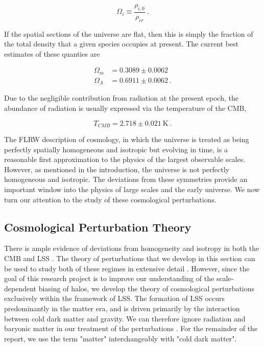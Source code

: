 \documentclass[10pt,letterpaper,final]{iopart}
\numberwithin{equation}{subsection}
\def\ni{\noindent}
\begin{document}
\begin{equation}\label{eq:OmegaDef}
\Omega_i \equiv \frac{\rho_{i,0}}{\rho_{cr}} \ .
\end{equation}

\ni If the spatial sections of the universe are flat, then this is simply the fraction of the total density that a given species occupies at present. The current best estimates of these quanties are \cite{Planck1}

\begin{align}
\Omega_m &= 0.3089 \pm 0.0062 \\ 
\Omega_\Lambda &= 0.6911 \pm 0.0062 \ .
\end{align}

\ni Due to the negligible contribution from radiation at the present epoch, the abundance of radiation is usually expressed via the temperature of the CMB,

\begin{equation}
T_{CMB} = 2.718 \pm 0.021 \ \text{K} \ .
\end{equation}


\ni The FLRW description of cosmology, in which the universe is treated as being perfectly spatially homogeneous and isotropic but evolving in time, is a reasonable first approximation to the physics of the largest observable scales. However, as mentioned in the introduction, the universe is not perfectly homogeneous and isotropic. The deviations from these symmetries provide an important window into the physics of large scales and the early universe. We now turn our attention to the study of these cosmological perturbations.


%
\subsection{Cosmological Perturbation Theory}\label{sec:PT}


There is ample evidence of deviations from homogeneity and isotropy in both the CMB and LSS \cite{Schneider}\cite{Dodelson}\cite{Planck1}. The theory of perturbations that we develop in this section can be used to study both of these regimes in extensive detail \cite{Dodelson}\cite{Baumann}. However, since the goal of this research project is to improve our understanding of the scale-dependent biasing of halos, we develop the theory of cosmological perturbations exclusively within the framework of LSS.  The formation of LSS occurs predominantly in the matter era, and is driven primarily by the interaction between cold dark matter and gravity. We can therefore ignore radiation and baryonic matter in our treatment of the perturbations \cite{Schneider}\cite{Dodelson}\cite{Baumann}\cite{Bernardeau}. For the remainder of the report, we use the term "matter" interchangeably with "cold dark matter". 
\end{document}
